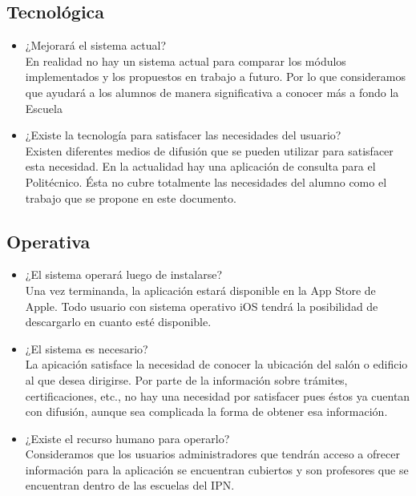 \subsection{Tecnológica}
	\begin{itemize}
		\item ¿Mejorará el sistema actual?\\
		En realidad no hay un sistema actual para comparar los módulos implementados y los propuestos en trabajo a futuro. Por lo que consideramos que ayudará a los alumnos de manera significativa a conocer más a fondo la Escuela
		\item ¿Existe la tecnología para satisfacer las necesidades del usuario?\\
		Existen diferentes medios de difusión que se pueden utilizar para satisfacer esta necesidad. En la actualidad hay una aplicación de consulta para el Politécnico. Ésta no cubre totalmente las necesidades del alumno como el trabajo que se propone en este documento.
	\end{itemize}

\subsection{Operativa}
	\begin{itemize}
	\item ¿El sistema operará luego de instalarse?\\
	Una vez terminanda, la aplicación estará disponible en la App Store de Apple. Todo usuario con sistema operativo iOS tendrá la posibilidad de descargarlo en cuanto esté disponible.
	\item ¿El sistema es necesario?\\
	La apicación satisface la necesidad de conocer la ubicación del salón o edificio al que desea dirigirse. Por parte de la información sobre trámites, certificaciones, etc., no hay una necesidad por satisfacer pues éstos ya cuentan con difusión, aunque sea complicada la forma de obtener esa información. 
	\item ¿Existe el recurso humano para operarlo?\\
	Consideramos que los usuarios administradores que tendrán acceso a ofrecer información para la aplicación se encuentran cubiertos y son profesores que se encuentran dentro de las escuelas del IPN.
\end{itemize}

